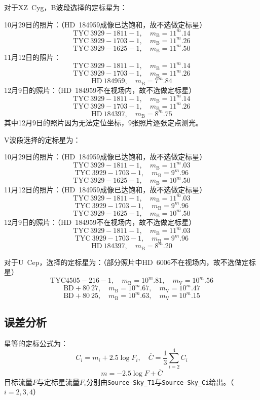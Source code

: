 \documentclass[a4paper,fontset=windows]{ctexart}
\begin{document}
    对于XZ\ Cyg，B波段选择的定标星为：

    10月29日的照片：（HD\ 184959成像已达饱和，故不选做定标星）
    \[
    \mathrm{TYC\ 3929-1811-1},\quad m_\mathrm{B} = 11^{m}.14
    \]
    \[
    \mathrm{TYC\ 3929-1703-1},\quad m_\mathrm{B} = 11^{m}.26
    \]
    \[
    \mathrm{TYC\ 3929-1625-1},\quad m_\mathrm{B} = 11^{m}.50
    \]
    11月12日的照片：
    \[
    \mathrm{TYC\ 3929-1811-1},\quad m_\mathrm{B} = 11^{m}.14
    \]
    \[
    \mathrm{TYC\ 3929-1703-1},\quad m_\mathrm{B} = 11^{m}.26
    \]
    \[
    \mathrm{HD\ 184959},\quad m_\mathrm{B} = 7^{m}.84
    \]
    12月9日的照片：（HD\ 184959不在视场内，故不选做定标星）
    \[
    \mathrm{TYC\ 3929-1811-1},\quad m_\mathrm{B} = 11^{m}.14
    \]
    \[
    \mathrm{TYC\ 3929-1703-1},\quad m_\mathrm{B} = 11^{m}.26
    \]
    \[
    \mathrm{HD\ 184397},\quad m_\mathrm{B} = 8^{m}.75
    \]
    其中12月9日的照片因为无法定位坐标，9张照片逐张定点测光。

    \medskip
    V波段选择的定标星为：

    10月29日的照片：（HD\ 184959成像已达饱和，故不选做定标星）
    \[
    \mathrm{TYC\ 3929-1811-1},\quad m_\mathrm{B} = 11^{m}.03
    \]
    \[
    \mathrm{TYC\ 3929-1703-1},\quad m_\mathrm{B} = 9^{m}.96
    \]
    \[
    \mathrm{TYC\ 3929-1625-1},\quad m_\mathrm{B} = 10^{m}.50
    \]
    11月12日的照片：（HD\ 184959成像已达饱和，故不选做定标星）
    \[
    \mathrm{TYC\ 3929-1811-1},\quad m_\mathrm{B} = 11^{m}.03
    \]
    \[
    \mathrm{TYC\ 3929-1703-1},\quad m_\mathrm{B} = 9^{m}.96
    \]
    \[
    \mathrm{TYC\ 3929-1625-1},\quad m_\mathrm{B} = 10^{m}.50
    \]
    12月9日的照片：（HD\ 184959不在视场内，故不选做定标星）
    \[
    \mathrm{TYC\ 3929-1811-1},\quad m_\mathrm{B} = 11^{m}.03
    \]
    \[
    \mathrm{TYC\ 3929-1703-1},\quad m_\mathrm{B} = 9^{m}.96
    \]
    \[
    \mathrm{HD\ 184397},\quad m_\mathrm{B} = 8^{m}.20
    \]

    \bigskip
    对于U\ Cep，选择的定标星为：（部分照片中HD\ 6006不在视场内，故不选做定标星）
    \[
    \mathrm{TYC 4505-216-1},\quad m_\mathrm{B} = 10^{m}.81,\quad m_\mathrm{V} = 10^{m}.56
    \]
    \[
    \mathrm{BD+80\ 27},\quad m_\mathrm{B} = 10^{m}.67,\quad m_\mathrm{V} = 10^{m}.47
    \]
    \[
    \mathrm{BD+80\ 25},\quad m_\mathrm{B} = 10^{m}.63,\quad m_\mathrm{V} = 10^{m}.15
    \]

    \newpage
    \subsection*{\Large 误差分析}
    星等的定标公式为：
    \[
    C_i = m_i + 2.5\log F_i,\quad \overline{C} = \frac{1}{3}\sum_{i=2}^{4}C_i
    \]
    \[
    m = -2.5\log F + \overline{C}
    \]
    目标流量$F$与定标星流量$F_i$分别由\texttt{\large Source-Sky\_T1}与\texttt{\large Source-Sky\_Ci}给出。（$i=2,3,4$）
\end{document}
